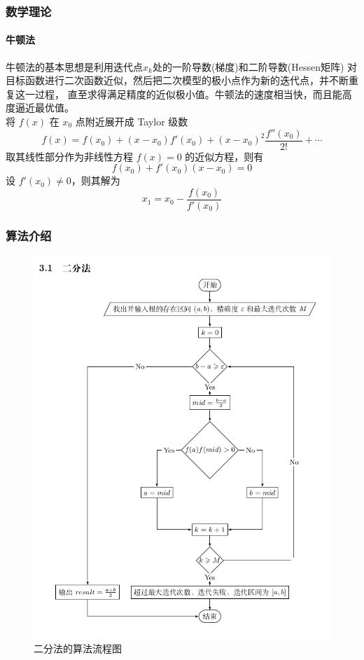 \documentclass[UTF8]{ctexbeamer}
\begin{document}
    \begin{frame}
        \frametitle{数学理论}
        \framesubtitle{牛顿法}
        牛顿法的基本思想是利用迭代点$x_k$处的一阶导数(梯度)和二阶导数(Hessen矩阵)
        对目标函数进行二次函数近似，然后把二次模型的极小点作为新的迭代点，并不断重复这一过程，
        直至求得满足精度的近似极小值。牛顿法的速度相当快，而且能高度逼近最优值。\\
        将 $f(x)$ 在 $x_0$ 点附近展开成 Taylor 级数\\
        \begin{equation}
            \label{E3}
            f(x) = f(x_0) + (x-x_0)f'(x_0) + (x-x_0)^2\frac{f''(x_0)}{2!} + \cdots
        \end{equation}
        取其线性部分作为非线性方程 $f(x) = 0$ 的近似方程，则有\\
        \begin{equation}
            \label{E4}
            f(x_0) + f'(x_0)(x-x_0) = 0
        \end{equation}
        设 $f'(x_0)\neq 0$，则其解为\\
        \begin{equation}
            \label{E5}
            x_1 = x_0 - \frac{f(x_0)}{f'(x_0)}
        \end{equation}
    \end{frame}
    \begin{frame}
        \frametitle{算法介绍}
        \begin{figure}[H]
            \centering
            \includegraphics[scale=0.22]{dichotony}
            \caption{二分法的算法流程图}
        \end{figure}
    \end{frame}
\end{document}
